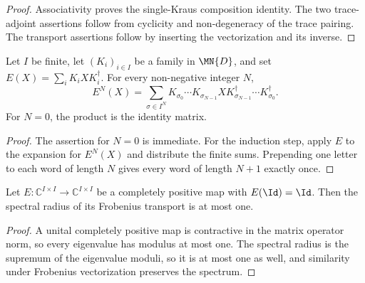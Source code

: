\begin{proof}
    \leanok
    Associativity proves the single-Kraus composition identity. The two
    trace-adjoint assertions follow from cyclicity and non-degeneracy of the
    trace pairing. The transport assertions follow by inserting the
    vectorization and its inverse.
\end{proof}

\begin{theorem}
    \label{thm:kraus_map_iterate_word_expansion}
    \leanok
    Let $I$ be finite, let $(K_i)_{i\in I}$ be a family in $\MN{D}$, and set
    $E(X)=\sum_i K_iXK_i^\dagger$. For every non-negative integer $N$,
    \[
        E^N(X)=\sum_{\sigma\in I^N}
        K_{\sigma_0}\cdots K_{\sigma_{N-1}}X
        K_{\sigma_{N-1}}^\dagger\cdots K_{\sigma_0}^\dagger.
    \]
    For $N=0$, the product is the identity matrix.
\end{theorem}

\begin{proof}
    \leanok
    The assertion for $N=0$ is immediate. For the induction step, apply $E$
    to the expansion for $E^N(X)$ and distribute the finite sums. Prepending
    one letter to each word of length $N$ gives every word of length $N+1$
    exactly once.
\end{proof}

\begin{theorem}
    \label{thm:unital_kraus_frobenius_spectral_radius}
    \leanok
    Let $E:\mathbb C^{I\times I}\to\mathbb C^{I\times I}$ be a completely
    positive map with $E(\Id)=\Id$.  Then the spectral radius of its
    Frobenius transport is at most one.
\end{theorem}

\begin{proof}
    \leanok
    A unital completely positive map is contractive in the matrix operator
    norm, so every eigenvalue has modulus at most one.  The spectral radius
    is the supremum of the eigenvalue moduli, so it is at most one as well,
    and similarity under Frobenius vectorization preserves the spectrum.
\end{proof}

